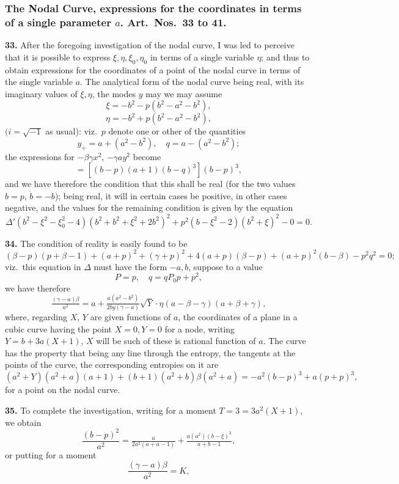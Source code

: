\documentclass[11pt,a4paper]{book}
\begin{document}
\subsubsection*{The Nodal Curve, expressions for the coordinates in terms of a single parameter $a$. Art.\ Nos.\ 33 to 41.}

\textbf{33.} After the foregoing investigation of the nodal curve, I was led to perceive that it is possible to express $\xi, \eta, \xi_0, \eta_0$ in terms of a single variable $\eta$; and thus to obtain expressions for the coordinates of a point of the nodal curve in terms of the single variable $a$. The analytical form of the nodal curve being real, with its imaginary values of $\xi, \eta$, the modes $y$ may we may assume
\[
\xi = -b^2 - p(b^2 - a^2 - b^2),
\]
\[
\eta = -b^2 + p(b^2 - a^2 - b^2),
\]
$(i = \sqrt{-1}$ as usual): viz.\ $p$ denote one or other of the quantities
\[
y_+ = a + (a^2 - b^2),\quad q = a - (a^2 - b^2);
\]
the expressions for $-\beta\gamma x^2$, $-\gamma a y^2$ become
\[
= [(b - p)(a + 1)(b - q)^3](b - p)^3,
\]
and we have therefore the condition that this shall be real (for the two values $b = p$, $\dot{b} = -b$); being real, it will in certain cases be positive, in other cases negative, and the values for the remaining condition is given by the equation
\[
\Delta'(b^2 - \xi^2 - \xi_0^2 - 4)(b^2 + b^2 + \xi^2 + 2b^2)^2 + p^2(b - \xi^2 - 2)(b^2 + \xi)^2 - 0 = 0.
\]

\textbf{34.} The condition of reality is easily found to be
\[
(\beta - p)(p + \beta - 1) + (a + p)^2 + (\gamma + p)^2 + 4(a + p)(\beta - p) + (a + p)^2(b - \beta) - p^2 q^2 = 0;
\]
viz.\ this equation in $\Delta$ must have the form $-a, b$, suppose to a value
\[
P = p, \quad q = qP_0p + p^2,
\]
we have therefore
\[
\tfrac{(\gamma - a)\beta}{a^2} = a + \tfrac{a(a^2 - b^2)}{2bg(\gamma - a)}\sqrt{Y}\cdot\eta(a - \beta - \gamma)(a + \beta + \gamma),
\]
where, regarding $X$, $Y$ are given functions of $a$, the coordinates of a plane in a cubic curve having the point $X = 0, Y = 0$ for a node, writing $Y = b + 3a(X + 1)$, $X$ will be such of these is rational function of $a$. The curve has the property that being any line through the entropy, the tangents at the points of the curve, the corresponding entropies on it are
\[
(a^2 + Y)(a^2 + a)(a + 1) + (b + 1)(a^2 + b)\beta(a^2 + a) = -a^2(b - p)^3 + a(p + p)^3,
\]
for a point on the nodal curve.

\textbf{35.} To complete the investigation, writing for a moment $T = 3 = 3a^2(X + 1)$, we obtain
\[
\frac{(b - p)^2}{a^2} = \tfrac{a}{2a^2(a + a - 1)} + \tfrac{a(a^2)(b - \xi)^3}{a + b - 1},
\]
or putting for a moment
\[
\frac{(\gamma - a)\beta}{a^2} = K,
\]
\end{document}
